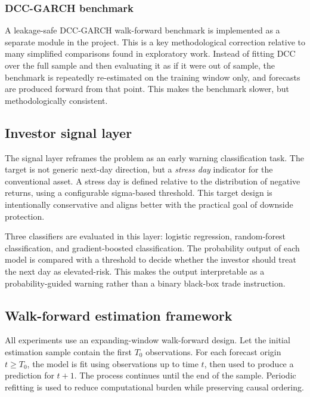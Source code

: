 \subsubsection{DCC-GARCH benchmark}

A leakage-safe DCC-GARCH walk-forward benchmark is implemented as a separate module in the project. This is a key methodological correction relative to many simplified comparisons found in exploratory work. Instead of fitting DCC over the full sample and then evaluating it as if it were out of sample, the benchmark is repeatedly re-estimated on the training window only, and forecasts are produced forward from that point. This makes the benchmark slower, but methodologically consistent.

\subsection{Investor signal layer}

The signal layer reframes the problem as an early warning classification task. The target is not generic next-day direction, but a \emph{stress day} indicator for the conventional asset. A stress day is defined relative to the distribution of negative returns, using a configurable sigma-based threshold. This target design is intentionally conservative and aligns better with the practical goal of downside protection.

Three classifiers are evaluated in this layer: logistic regression, random-forest classification, and gradient-boosted classification. The probability output of each model is compared with a threshold to decide whether the investor should treat the next day as elevated-risk. This makes the output interpretable as a probability-guided warning rather than a binary black-box trade instruction.

\subsection{Walk-forward estimation framework}

All experiments use an expanding-window walk-forward design. Let the initial estimation sample contain the first $T_0$ observations. For each forecast origin $t \geq T_0$, the model is fit using observations up to time $t$, then used to produce a prediction for $t+1$. The process continues until the end of the sample. Periodic refitting is used to reduce computational burden while preserving causal ordering.

